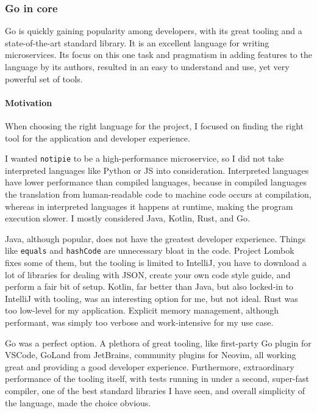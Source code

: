 \subsubsection{Go in core}\label{sec:go-in-core}

Go is quickly gaining popularity among developers,
with its great tooling
and a state-of-the-art standard library.
It is an excellent language for writing microservices.
Its focus on this one task
and pragmatism in adding features to the language by its authors,
resulted in an easy to understand and use,
yet very powerful set of tools.

\paragraph*{Motivation}\label{sec:motivation}

When choosing the right language for the project,
I focused on finding the right tool
for the application and developer experience.

I wanted \texttt{notipie} to be a high-performance microservice,
so I did not take interpreted languages
like Python or \acf{JS} into consideration.
Interpreted languages have lower performance
than compiled languages, because
in compiled languages the translation
from human-readable code to machine code
occurs at compilation, whereas
in interpreted languages it happens at runtime,
making the program execution slower.
I mostly considered Java, Kotlin, Rust, and Go.

Java, although popular, does not have the greatest developer experience.
Things like \texttt{equals} and \texttt{hashCode}
are unnecessary bloat in the code.
Project Lombok~\cite{zwitserloot_project_2022} fixes some of them,
but the tooling is limited to IntelliJ,
you have to download a lot of libraries for dealing with \ac{JSON},
create your own code style guide,
and perform a fair bit of setup.
Kotlin, far better than Java,
but also locked-in to IntelliJ with tooling,
was an interesting option for me, but not ideal.
Rust was too low-level for my application.
Explicit memory management, although performant,
was simply too verbose and work-intensive for my use case.

Go was a perfect option.
A plethora of great tooling,
like first-party Go plugin for \ac{VSCode}, GoLand from JetBrains,
community plugins for Neovim,
all working great and providing a good developer experience.
Furthermore, extraordinary performance of the tooling itself,
with tests running in under a second, super-fast compiler,
one of the best standard libraries I have seen,
and overall simplicity of the language, made the choice obvious.
